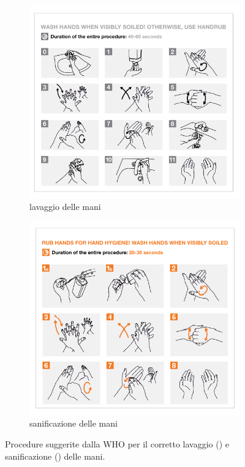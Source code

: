 \begin{figure}[!htb]
    \centering
    \begin{subfigure}{.45\textwidth}
        \includegraphics[width=\textwidth]{figure/handwash.png}
        \caption{lavaggio delle mani}
        \label{fig:handwash}
    \end{subfigure}
    \begin{subfigure}{.45\textwidth}
        \includegraphics[width=\textwidth]{figure/handsan.png}
        \caption{sanificazione delle mani}
        \label{fig:handsan}
    \end{subfigure}
    \caption{Procedure suggerite dalla WHO per il corretto lavaggio () e sanificazione () delle mani.}
    \label{fig:who-steps}
\end{figure}

